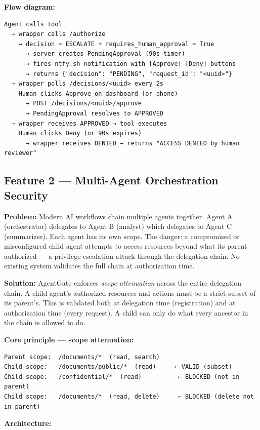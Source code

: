 \documentclass[12pt, a4paper]{article}
\begin{document}
\textbf{Flow diagram:}

\begin{verbatim}
Agent calls tool
  → wrapper calls /authorize
    → decision = ESCALATE + requires_human_approval = True
      → server creates PendingApproval (90s timer)
      → fires ntfy.sh notification with [Approve] [Deny] buttons
      → returns {"decision": "PENDING", "request_id": "<uuid>"}
  → wrapper polls /decisions/<uuid> every 2s
    Human clicks Approve on dashboard (or phone)
      → POST /decisions/<uuid>/approve
      → PendingApproval resolves to APPROVED
  → wrapper receives APPROVED → tool executes
    Human clicks Deny (or 90s expires)
      → wrapper receives DENIED → returns "ACCESS DENIED by human reviewer"
\end{verbatim}

\subsection{Feature 2 — Multi-Agent Orchestration Security}

\textbf{Problem:} Modern AI workflows chain multiple agents together.
Agent A (orchestrator) delegates to Agent B (analyst) which delegates to
Agent C (summarizer). Each agent has its own scope. The danger: a compromised
or misconfigured child agent attempts to access resources beyond what its
parent authorized — a privilege escalation attack through the delegation chain.
No existing system validates the full chain at authorization time.

\textbf{Solution:} AgentGate enforces \textit{scope attenuation} across the
entire delegation chain. A child agent's authorized resources and actions must
be a strict subset of its parent's. This is validated both at delegation time
(registration) and at authorization time (every request). A child can only do
what every ancestor in the chain is allowed to do.

\textbf{Core principle — scope attenuation:}

\begin{verbatim}
Parent scope:  /documents/*  (read, search)
Child scope:   /documents/public/*  (read)     ← VALID (subset)
Child scope:   /confidential/*  (read)          ← BLOCKED (not in parent)
Child scope:   /documents/*  (read, delete)     ← BLOCKED (delete not in parent)
\end{verbatim}

\textbf{Architecture:}
\end{document}
